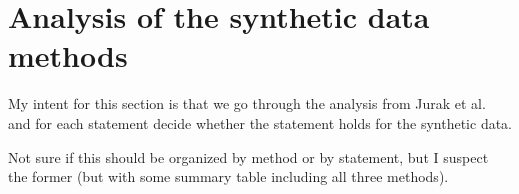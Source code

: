 \section{Analysis of the synthetic data methods}

My intent for this section is that we go through the analysis from Jurak et al.~\cite{jurak2021associations} and for each statement decide whether the statement holds for the synthetic data.

Not sure if this should be organized by method or by statement, but I suspect the former (but with some summary table including all three methods).

